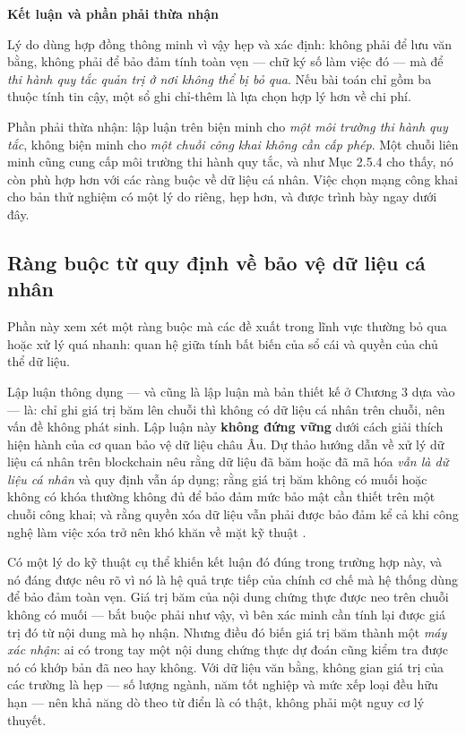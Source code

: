 \noindent \textbf{Kết luận và phần phải thừa nhận}

Lý do dùng hợp đồng thông minh vì vậy hẹp và xác định: không phải để lưu văn bằng, không phải để bảo đảm tính toàn vẹn --- chữ ký số làm việc đó --- mà để \emph{thi hành quy tắc quản trị ở nơi không thể bị bỏ qua}. Nếu bài toán chỉ gồm ba thuộc tính tin cậy, một sổ ghi chỉ-thêm là lựa chọn hợp lý hơn về chi phí.

Phần phải thừa nhận: lập luận trên biện minh cho \emph{một môi trường thi hành quy tắc}, không biện minh cho \emph{một chuỗi công khai không cần cấp phép}. Một chuỗi liên minh cũng cung cấp môi trường thi hành quy tắc, và như Mục 2.5.4 cho thấy, nó còn phù hợp hơn với các ràng buộc về dữ liệu cá nhân. Việc chọn mạng công khai cho bản thử nghiệm có một lý do riêng, hẹp hơn, và được trình bày ngay dưới đây.

\subsection{Ràng buộc từ quy định về bảo vệ dữ liệu cá nhân}

Phần này xem xét một ràng buộc mà các đề xuất trong lĩnh vực thường bỏ qua hoặc xử lý quá nhanh: quan hệ giữa tính bất biến của sổ cái và quyền của chủ thể dữ liệu.

Lập luận thông dụng --- và cũng là lập luận mà bản thiết kế ở Chương 3 dựa vào --- là: chỉ ghi giá trị băm lên chuỗi thì không có dữ liệu cá nhân trên chuỗi, nên vấn đề không phát sinh. Lập luận này \textbf{không đứng vững} dưới cách giải thích hiện hành của cơ quan bảo vệ dữ liệu châu Âu. Dự thảo hướng dẫn về xử lý dữ liệu cá nhân trên blockchain nêu rằng dữ liệu đã băm hoặc đã mã hóa \emph{vẫn là dữ liệu cá nhân} và quy định vẫn áp dụng; rằng giá trị băm không có muối hoặc không có khóa thường không đủ để bảo đảm mức bảo mật cần thiết trên một chuỗi công khai; và rằng quyền xóa dữ liệu vẫn phải được bảo đảm kể cả khi công nghệ làm việc xóa trở nên khó khăn về mặt kỹ thuật \cite{EDPB2025}.

Có một lý do kỹ thuật cụ thể khiến kết luận đó đúng trong trường hợp này, và nó đáng được nêu rõ vì nó là hệ quả trực tiếp của chính cơ chế mà hệ thống dùng để bảo đảm toàn vẹn. Giá trị băm của nội dung chứng thực được neo trên chuỗi không có muối --- bắt buộc phải như vậy, vì bên xác minh cần tính lại được giá trị đó từ nội dung mà họ nhận. Nhưng điều đó biến giá trị băm thành một \emph{máy xác nhận}: ai có trong tay một nội dung chứng thực dự đoán cũng kiểm tra được nó có khớp bản đã neo hay không. Với dữ liệu văn bằng, không gian giá trị của các trường là hẹp --- số lượng ngành, năm tốt nghiệp và mức xếp loại đều hữu hạn --- nên khả năng dò theo từ điển là có thật, không phải một nguy cơ lý thuyết.


